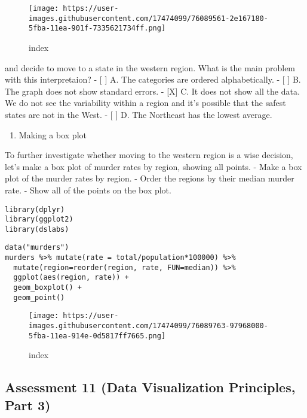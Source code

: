 \documentclass[]{article}
\providecommand{\tightlist}{%
  \setlength{\itemsep}{0pt}\setlength{\parskip}{0pt}}
\begin{document}
\begin{figure}
\centering
\texttt{[image: https://user-images.githubusercontent.com/17474099/76089561-2e167180-5fba-11ea-901f-7335621734ff.png]}
\caption{index}
\end{figure}

and decide to move to a state in the western region. What is the main
problem with this interpretaion? - {[} {]} A. The categories are ordered
alphabetically. - {[} {]} B. The graph does not show standard errors. -
{[}X{]} C. It does not show all the data. We do not see the variability
within a region and it's possible that the safest states are not in the
West. - {[} {]} D. The Northeast has the lowest average.

\begin{enumerate}
\def\labelenumi{\arabic{enumi}.}
\setcounter{enumi}{3}
\tightlist
\item
  Making a box plot
\end{enumerate}

To further investigate whether moving to the western region is a wise
decision, let's make a box plot of murder rates by region, showing all
points. - Make a box plot of the murder rates by region. - Order the
regions by their median murder rate. - Show all of the points on the box
plot.

\begin{verbatim}
library(dplyr)
library(ggplot2)
library(dslabs)
\end{verbatim}

\begin{verbatim}
data("murders")
murders %>% mutate(rate = total/population*100000) %>%
  mutate(region=reorder(region, rate, FUN=median)) %>%
  ggplot(aes(region, rate)) +
  geom_boxplot() +
  geom_point()
\end{verbatim}

\begin{figure}
\centering
\texttt{[image: https://user-images.githubusercontent.com/17474099/76089763-97968000-5fba-11ea-914e-0d5817ff7665.png]}
\caption{index}
\end{figure}

\hypertarget{assessment-11-data-visualization-principles-part-3}{%
\subsection{Assessment 11 (Data Visualization Principles, Part
3)}\label{assessment-11-data-visualization-principles-part-3}}
\end{document}
